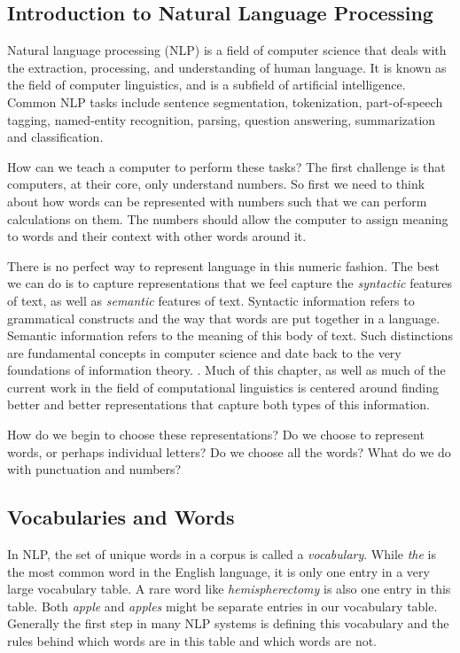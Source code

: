 \subsection{Introduction to Natural Language Processing}

Natural language processing (NLP) is a field of computer science that deals with the extraction, processing, and understanding of human language.
It is known as the field of computer linguistics, and is a subfield of artificial intelligence.
Common NLP tasks include sentence segmentation, tokenization, part-of-speech tagging, named-entity recognition, parsing, question answering, summarization and classification.

How can we teach a computer to perform these tasks?
The first challenge is that computers, at their core, only understand numbers.
So first we need to think about how words can be represented with numbers such that we can perform calculations on them.
The numbers should allow the computer to assign meaning to words and their context with other words around it.

There is no perfect way to represent language in this numeric fashion. The best we can do is to capture representations that we feel capture the \textit{syntactic} features of text, as well as \textit{semantic} features of text.
Syntactic information refers to grammatical constructs and the way that words are put together in a language. Semantic information refers to the meaning of this body of text. Such distinctions are fundamental concepts in computer science
and date back to the very foundations of information theory. \cite{shannon48}. Much of this chapter, as well as much of the current work in the field of computational linguistics is centered around finding better and better representations that capture both types of this information.

How do we begin to choose these representations? Do we choose to represent words, or perhaps individual letters? Do we choose all the words? What do we do with punctuation and numbers?

\subsection{Vocabularies and Words}

In NLP, the set of unique words in a corpus is called a \textit{vocabulary}. While \textit{the} is the most common word in the English language, it is only one entry in a very large vocabulary table. A rare word like \textit{hemispherectomy} is also one
entry in this table. Both \textit{apple} and \textit{apples} might be separate entries in our vocabulary table. Generally the first step in many NLP systems is defining this vocabulary and the rules behind which words are in this table and which words are not.

